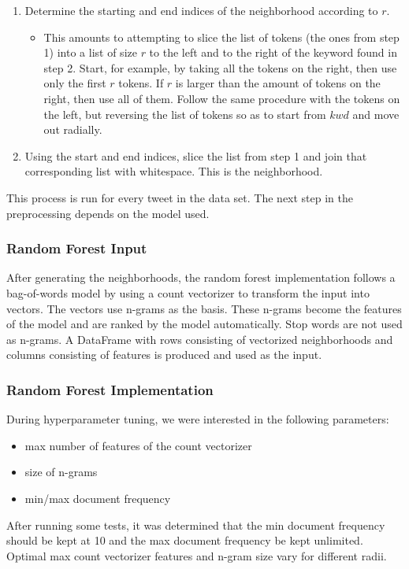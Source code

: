 \documentclass[12pt, a4paper]{article}
\begin{document}
\begin{enumerate}
    \item Determine the starting and end indices of the neighborhood according to $r$.
        \begin{itemize}
            \item This amounts to attempting to slice the list of tokens (the ones from step 1) into a list of size $r$ to the left and to the right of the keyword found in step 2. Start, for example, by taking all the tokens on the right, then use only the first $r$ tokens. If $r$ is larger than the amount of tokens on the right, then use all of them. Follow the same procedure with the tokens on the left, but reversing the list of tokens so as to start from $kwd$ and move out radially.
        \end{itemize}
    \item Using the start and end indices, slice the list from step 1 and join that corresponding list with whitespace. This is the neighborhood.
\end{enumerate}

This process is run for every tweet in the data set. The next step in the preprocessing depends on the model used.

\subsubsection{Random Forest Input}
After generating the neighborhoods, the random forest implementation follows a bag-of-words model by using a count vectorizer to transform the input into vectors. The vectors use n-grams as the basis. These n-grams become the features of the model and are ranked by the model automatically. Stop words are not used as n-grams. A DataFrame with rows consisting of vectorized neighborhoods and columns consisting of features is produced and used as the input.


\subsubsection{Random Forest Implementation}
During hyperparameter tuning, we were interested in the following parameters:
\begin{itemize}
    \item max number of features of the count vectorizer
    \item size of n-grams
    \item min/max document frequency
\end{itemize}

After running some tests, it was determined that the min document frequency should be kept at 10 and the max document frequency be kept unlimited. Optimal max count vectorizer features and n-gram size vary for different radii.
\end{document}
